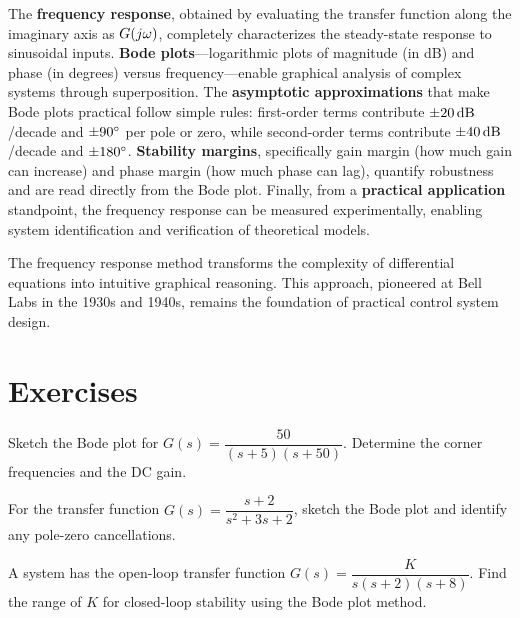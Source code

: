 The \textbf{frequency response}, obtained by evaluating the transfer function along the imaginary axis as $G(j\omega)$, completely characterizes the steady-state response to sinusoidal inputs. \textbf{Bode plots}---logarithmic plots of magnitude (in dB) and phase (in degrees) versus frequency---enable graphical analysis of complex systems through superposition. The \textbf{asymptotic approximations} that make Bode plots practical follow simple rules: first-order terms contribute $\pm 20\,\text{dB}$/decade and $\pm 90^\circ$ per pole or zero, while second-order terms contribute $\pm 40\,\text{dB}$/decade and $\pm 180^\circ$. \textbf{Stability margins}, specifically gain margin (how much gain can increase) and phase margin (how much phase can lag), quantify robustness and are read directly from the Bode plot. Finally, from a \textbf{practical application} standpoint, the frequency response can be measured experimentally, enabling system identification and verification of theoretical models.

\begin{keypoint}
The frequency response method transforms the complexity of differential equations into intuitive graphical reasoning. This approach, pioneered at Bell Labs in the 1930s and 1940s, remains the foundation of practical control system design.
\end{keypoint}

\newpage
\section{Exercises}
\label{sec:exercises}

\begin{exercise}
Sketch the Bode plot for $G(s) = \dfrac{50}{(s+5)(s+50)}$. Determine the corner frequencies and the DC gain.
\end{exercise}

\begin{exercise}
For the transfer function $G(s) = \dfrac{s+2}{s^2+3s+2}$, sketch the Bode plot and identify any pole-zero cancellations.
\end{exercise}

\begin{exercise}
A system has the open-loop transfer function $G(s) = \dfrac{K}{s(s+2)(s+8)}$. Find the range of $K$ for closed-loop stability using the Bode plot method.
\end{exercise}

